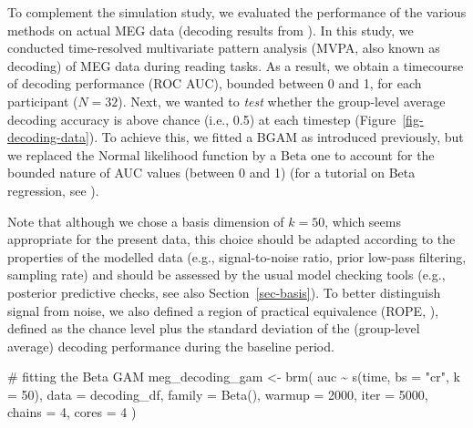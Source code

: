 \documentclass[
  doc,
  floatsintext,
  longtable,
  a4paper,
  nolmodern,
  notxfonts,
  notimes,
  donotrepeattitle,
  colorlinks=true,linkcolor=blue,citecolor=blue,urlcolor=blue]{apa7}
\newenvironment{Shaded}{\begin{snugshade}}{\end{snugshade}}
\newcommand{\AttributeTok}[1]{\textcolor[rgb]{0.40,0.45,0.13}{#1}}
\newcommand{\CommentTok}[1]{\textcolor[rgb]{0.37,0.37,0.37}{#1}}
\newcommand{\DecValTok}[1]{\textcolor[rgb]{0.68,0.00,0.00}{#1}}
\newcommand{\FunctionTok}[1]{\textcolor[rgb]{0.28,0.35,0.67}{#1}}
\newcommand{\NormalTok}[1]{\textcolor[rgb]{0.00,0.23,0.31}{#1}}
\newcommand{\OtherTok}[1]{\textcolor[rgb]{0.00,0.23,0.31}{#1}}
\newcommand{\SpecialCharTok}[1]{\textcolor[rgb]{0.37,0.37,0.37}{#1}}
\newcommand{\StringTok}[1]{\textcolor[rgb]{0.13,0.47,0.30}{#1}}
\begin{document}
To complement the simulation study, we evaluated the performance of the
various methods on actual MEG data (decoding results from
). In
this study, we conducted time-resolved multivariate pattern analysis
(MVPA, also known as decoding) of MEG data during reading tasks. As a
result, we obtain a timecourse of decoding performance (ROC AUC),
bounded between 0 and 1, for each participant (\(N=32\)). Next, we
wanted to \emph{test} whether the group-level average decoding accuracy
is above chance (i.e., 0.5) at each timestep
(Figure~\ref{fig-decoding-data}). To achieve this, we fitted a BGAM as
introduced previously, but we replaced the \(\mathrm{Normal}\)
likelihood function by a \(\mathrm{Beta}\) one to account for the
bounded nature of AUC values (between 0 and 1) (for a tutorial on Beta
regression, see ).

Note that although we chose a basis dimension of \(k=50\), which seems
appropriate for the present data, this choice should be adapted
according to the properties of the modelled data (e.g., signal-to-noise
ratio, prior low-pass filtering, sampling rate) and should be assessed
by the usual model checking tools (e.g., posterior predictive checks,
see also Section~\ref{sec-basis}). To better distinguish signal from
noise, we also defined a region of practical equivalence (ROPE,
), defined as the
chance level plus the standard deviation of the (group-level average)
decoding performance during the baseline period.

\begin{Shaded}
\begin{Highlighting}[]
\CommentTok{\# fitting the Beta GAM}
\NormalTok{meg\_decoding\_gam }\OtherTok{\textless{}{-}} \FunctionTok{brm}\NormalTok{(}
\NormalTok{    auc }\SpecialCharTok{\textasciitilde{}} \FunctionTok{s}\NormalTok{(time, }\AttributeTok{bs =} \StringTok{"cr"}\NormalTok{, }\AttributeTok{k =} \DecValTok{50}\NormalTok{),}
    \AttributeTok{data =}\NormalTok{ decoding\_df,}
    \AttributeTok{family =} \FunctionTok{Beta}\NormalTok{(),}
    \AttributeTok{warmup =} \DecValTok{2000}\NormalTok{,}
    \AttributeTok{iter =} \DecValTok{5000}\NormalTok{,}
    \AttributeTok{chains =} \DecValTok{4}\NormalTok{,}
    \AttributeTok{cores =} \DecValTok{4}
\NormalTok{    )}
\end{Highlighting}
\end{Shaded}
\end{document}
